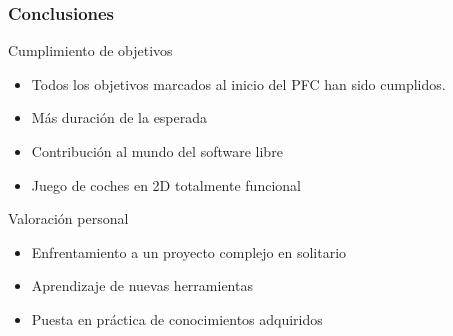 \begin{frame}
    \frametitle{Conclusiones}

        \begin{block}{Cumplimiento de objetivos}
            \begin{itemize}
                \item Todos los objetivos marcados al inicio del PFC han sido cumplidos.
                \item Más duración de la esperada
                \item Contribución al mundo del software libre
                \item Juego de coches en 2D totalmente funcional
            \end{itemize}
        \end{block}



        \begin{block}{Valoración personal}
            \begin{itemize}
                \item Enfrentamiento a un proyecto complejo en solitario
                \item Aprendizaje de nuevas herramientas
                \item Puesta en práctica de conocimientos adquiridos
            \end{itemize}
        \end{block}

\end{frame}

